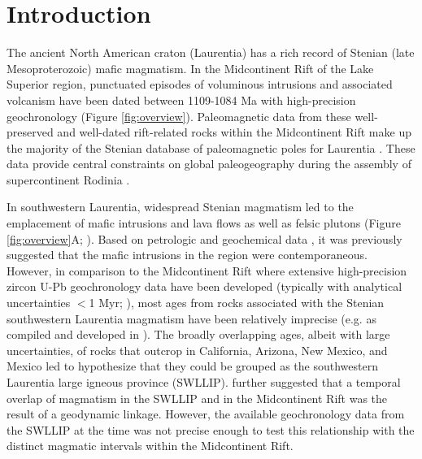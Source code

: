 \section{Introduction}

The ancient North American craton (Laurentia) has a rich record of Stenian (late Mesoproterozoic) mafic magmatism. In the Midcontinent Rift of the Lake Superior region, punctuated episodes of voluminous intrusions and associated volcanism have been dated between 1109-1084 Ma with high-precision geochronology (Figure \ref{fig:overview}). Paleomagnetic data from these well-preserved and well-dated rift-related rocks within the Midcontinent Rift make up the majority of the Stenian database of paleomagnetic poles for Laurentia \citep{Evans2021a}. These data provide central constraints on global paleogeography during the assembly of supercontinent Rodinia \citep{Swanson-Hysell2021c, Evans2021b}. 

In southwestern Laurentia, widespread Stenian magmatism led to the emplacement of mafic intrusions and lava flows as well as felsic plutons (Figure \ref{fig:overview}A; \cite{Wrucke1966a, Shride1967a, Hendricks1972a, Howard1991a, Bright2014a}). Based on petrologic and geochemical data \cite[e.g.][]{Wrucke1966a, Wrucke1972a, Hammond1986a}, it was previously suggested that the mafic intrusions in the region were contemporaneous. However, in comparison to the Midcontinent Rift where extensive high-precision zircon U-Pb geochronology data have been developed (typically with analytical uncertainties $<$1 Myr; ), most ages from rocks associated with the Stenian southwestern Laurentia magmatism have been relatively imprecise (e.g. as compiled and developed in \cite{Bright2014a}). The broadly overlapping ages, albeit with large uncertainties, of rocks that outcrop in California, Arizona, New Mexico, and Mexico led \cite{Bright2014a} to hypothesize that they could be grouped as the southwestern Laurentia large igneous province (SWLLIP). \cite{Bright2014a} further suggested that a temporal overlap of magmatism in the SWLLIP and in the Midcontinent Rift was the result of a geodynamic linkage. However, the available geochronology data from the SWLLIP at the time was not precise enough to test this relationship with the distinct magmatic intervals within the Midcontinent Rift. 

